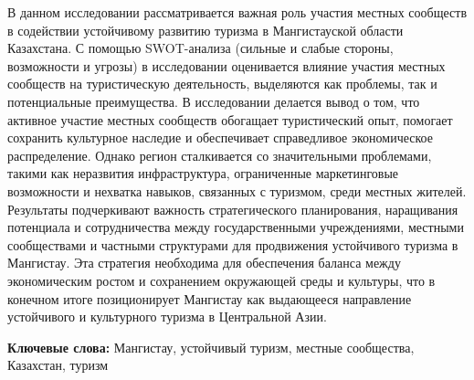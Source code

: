 В данном исследовании рассматривается важная роль участия местных
сообществ в содействии устойчивому развитию туризма в Мангистауской
области Казахстана. С помощью SWOT-анализа (сильные и слабые стороны,
возможности и угрозы) в исследовании оценивается влияние участия местных
сообществ на туристическую деятельность, выделяются как проблемы, так и
потенциальные преимущества. В исследовании делается вывод о том, что
активное участие местных сообществ обогащает туристический опыт,
помогает сохранить культурное наследие и обеспечивает справедливое
экономическое распределение. Однако регион сталкивается со значительными
проблемами, такими как неразвития инфраструктура, ограниченные
маркетинговые возможности и нехватка навыков, связанных с туризмом,
среди местных жителей. Результаты подчеркивают важность стратегического
планирования, наращивания потенциала и сотрудничества между
государственными учреждениями, местными сообществами и частными
структурами для продвижения устойчивого туризма в Мангистау. Эта
стратегия необходима для обеспечения баланса между экономическим ростом
и сохранением окружающей среды и культуры, что в конечном итоге
позиционирует Мангистау как выдающееся направление устойчивого и
культурного туризма в Центральной Азии.

{\bfseries Ключевые слова:} Мангистау, устойчивый туризм, местные
сообщества, Казахстан, туризм

